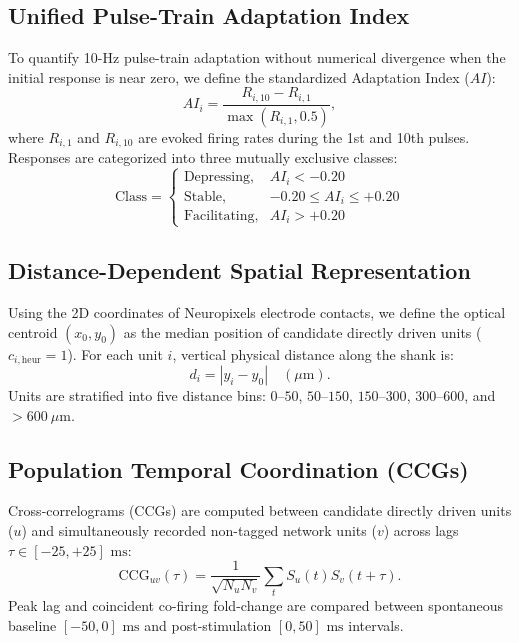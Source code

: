 \documentclass[10pt,journal,compsoc]{IEEEtran}
\begin{document}
\subsection{Unified Pulse-Train Adaptation Index}
To quantify 10-Hz pulse-train adaptation without numerical divergence when the initial response is near zero, we define the standardized Adaptation Index ($AI$):
\begin{equation}
    AI_i = \frac{R_{i,10} - R_{i,1}}{\max(R_{i,1}, 0.5)},
\end{equation}
where $R_{i,1}$ and $R_{i,10}$ are evoked firing rates during the 1st and 10th pulses. Responses are categorized into three mutually exclusive classes:
\begin{equation}
    \text{Class} = \begin{cases}
        \text{Depressing}, & AI_i < -0.20 \\
        \text{Stable}, & -0.20 \le AI_i \le +0.20 \\
        \text{Facilitating}, & AI_i > +0.20
    \end{cases}
\end{equation}

\subsection{Distance-Dependent Spatial Representation}
Using the 2D coordinates of Neuropixels electrode contacts, we define the optical centroid $(x_0, y_0)$ as the median position of candidate directly driven units ($c_{i,\text{heur}}=1$). For each unit $i$, vertical physical distance along the shank is:
\begin{equation}
    d_i = |y_i - y_0| \quad (\mu\text{m}).
\end{equation}
Units are stratified into five distance bins: $0–50$, $50–150$, $150–300$, $300–600$, and $>600\ \mu\text{m}$.

\subsection{Population Temporal Coordination (CCGs)}
Cross-correlograms (CCGs) are computed between candidate directly driven units ($u$) and simultaneously recorded non-tagged network units ($v$) across lags $\tau \in [-25, +25]\text{ ms}$:
\begin{equation}
    \text{CCG}_{uv}(\tau) = \frac{1}{\sqrt{N_u N_v}} \sum_{t} S_u(t) S_v(t + \tau).
\end{equation}
Peak lag and coincident co-firing fold-change are compared between spontaneous baseline $[-50, 0]\text{ ms}$ and post-stimulation $[0, 50]\text{ ms}$ intervals.
\end{document}
